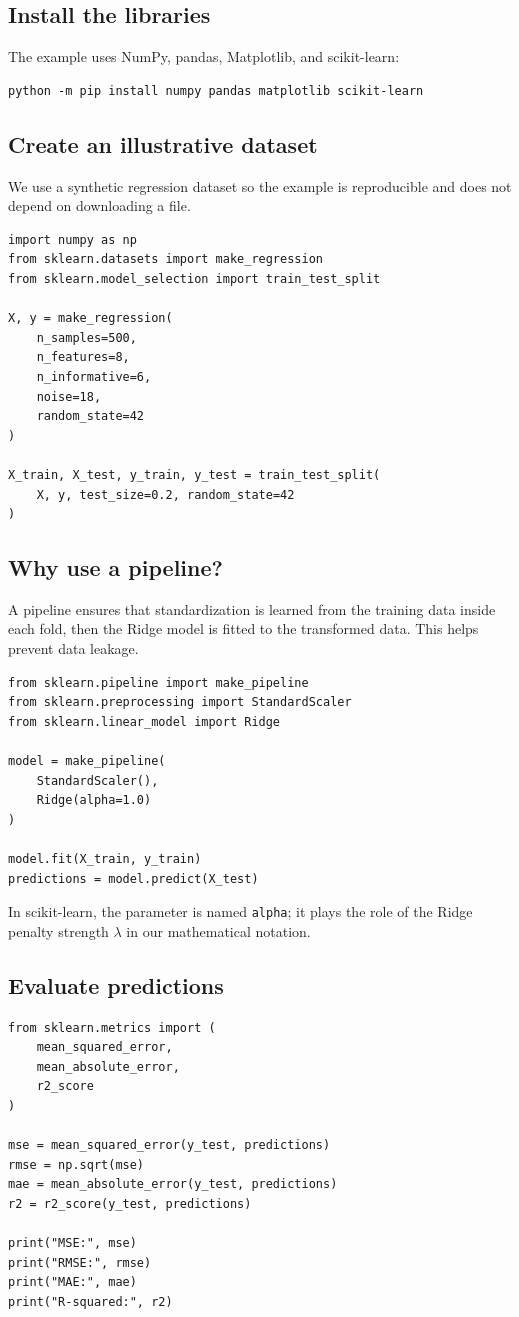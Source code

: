 \documentclass[11pt,a4paper]{article}
\numberwithin{equation}{section}
\theoremstyle{remark}
\begin{document}
\subsection{Install the libraries}
The example uses NumPy, pandas, Matplotlib, and scikit-learn:
\begin{lstlisting}
python -m pip install numpy pandas matplotlib scikit-learn
\end{lstlisting}

\subsection{Create an illustrative dataset}
We use a synthetic regression dataset so the example is reproducible and
does not depend on downloading a file.

\begin{lstlisting}
import numpy as np
from sklearn.datasets import make_regression
from sklearn.model_selection import train_test_split

X, y = make_regression(
    n_samples=500,
    n_features=8,
    n_informative=6,
    noise=18,
    random_state=42
)

X_train, X_test, y_train, y_test = train_test_split(
    X, y, test_size=0.2, random_state=42
)
\end{lstlisting}

\subsection{Why use a pipeline?}
A pipeline ensures that standardization is learned from the training data
inside each fold, then the Ridge model is fitted to the transformed data.
This helps prevent data leakage.

\begin{lstlisting}
from sklearn.pipeline import make_pipeline
from sklearn.preprocessing import StandardScaler
from sklearn.linear_model import Ridge

model = make_pipeline(
    StandardScaler(),
    Ridge(alpha=1.0)
)

model.fit(X_train, y_train)
predictions = model.predict(X_test)
\end{lstlisting}

In scikit-learn, the parameter is named \texttt{alpha}; it plays the role
of the Ridge penalty strength $\lambda$ in our mathematical notation.

\subsection{Evaluate predictions}
\begin{lstlisting}
from sklearn.metrics import (
    mean_squared_error,
    mean_absolute_error,
    r2_score
)

mse = mean_squared_error(y_test, predictions)
rmse = np.sqrt(mse)
mae = mean_absolute_error(y_test, predictions)
r2 = r2_score(y_test, predictions)

print("MSE:", mse)
print("RMSE:", rmse)
print("MAE:", mae)
print("R-squared:", r2)
\end{lstlisting}
\end{document}

